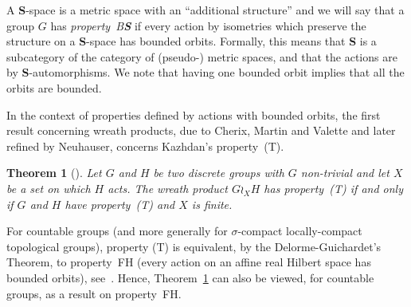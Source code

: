 \documentclass[a4paper]{article}
\newtheorem{thm}[lem]{Theorem}
\theoremstyle{definition}
\newcommand*{\category}[1]{\textbf{#1}}
\newcommand*{\CatS}{\category{S}}
\newcommand*{\BS}{B\textbf{S}}
\newcommand*{\FH}{FH}
\begin{document}
A \CatS-space is a metric space with an ``additional structure'' and we will say that a group $G$ has \emph{property~\BS} if every action by isometries which preserve the structure on a \CatS-space has bounded orbits.
Formally, this means that \CatS{} is a subcategory of the category of (pseudo-) metric spaces, and that the actions are by \CatS-automorphisms.
We note that having one bounded orbit implies that all the orbits are bounded.

In the context of properties defined by actions with bounded orbits, the first result concerning wreath products, due to Cherix, Martin and Valette and later refined by Neuhauser, concerns Kazhdan's property~(T).
%
%
\begin{thm}[\cite{Cherix2004,Neuhauser2005a}] \label{T:Wreath_prop_T}
Let $G$ and $H$ be two discrete groups with $G$ non-trivial and let $X$ be a set on which $H$ acts.
The wreath product $G \wr_X H$ has property~(T) if and only if $G$ and $H$ have property~(T) and $X$ is finite.
\end{thm}
%
%
For countable groups (and more generally for $\sigma$-compact locally-compact topological groups), property (T) is equivalent, by the Delorme-Guichardet's Theorem, to property~\FH{} (every action on an affine real Hilbert space has bounded orbits), see~\cite[Thm. 2.12.4]{Bekka2008}.
Hence, Theorem~\ref{T:Wreath_prop_T} can also be viewed, for countable groups, as a result on property~\FH.
\end{document}
